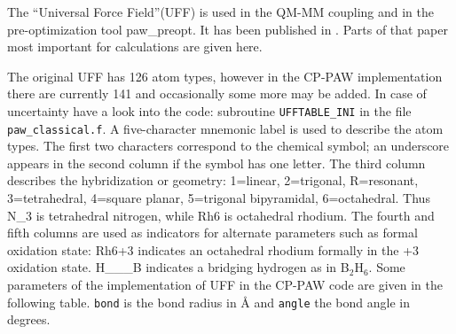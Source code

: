 \documentclass[final,12pt,makeidx,DIV=calc]{article}
\begin{document}
{{{{{{The ``Universal Force Field''(UFF)\cite{rappe92_jacs114_10024} is used
in the QM-MM coupling and in the pre-optimization tool paw\_preopt. It
has been published in \cite{rappe92_jacs114_10024}. Parts of that
paper most important for calculations are given here.

The original UFF has 126 atom types, however in the CP-PAW
implementation there are currently 141 and occasionally some more may
be added. In case of uncertainty have a look into the code: subroutine
\texttt{UFFTABLE\_INI} in the file \texttt{paw\_classical.f}. A
five-character mnemonic label is used to describe the atom types. The
first two characters correspond to the chemical symbol; an underscore
appears in the second column if the symbol has one letter. The third
column describes the hybridization or geometry: 1=linear, 2=trigonal,
R=resonant, 3=tetrahedral, 4=square planar, 5=trigonal bipyramidal,
6=octahedral. Thus N\_3 is tetrahedral nitrogen, while Rh6 is
octahedral rhodium. The fourth and fifth columns are used as indicators
for alternate parameters such as formal oxidation state: Rh6+3
indicates an octahedral rhodium formally in the +3 oxidation
state. H\_\_\_B indicates a bridging hydrogen as in B$_2$H$_6$.  Some
parameters of the implementation of UFF in the CP-PAW code are given
in the following table. \verb'bond' is the bond radius in \AA{} and
\verb'angle' the bond angle in degrees.

}}}}}}
\end{document}
